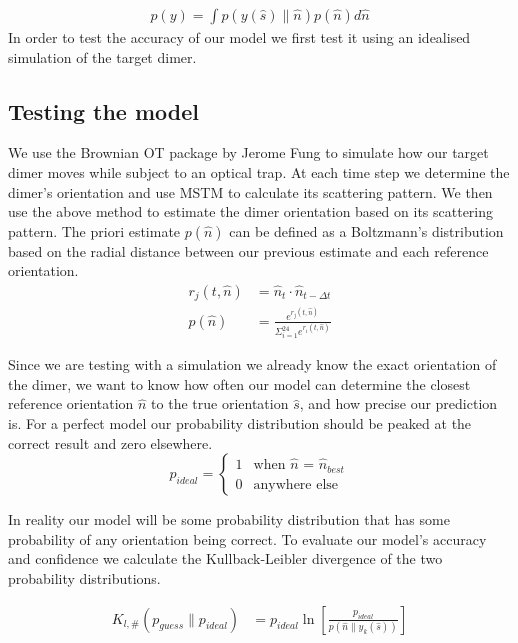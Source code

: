 \documentclass[11pt]{article}
\begin{document}
	\begin{align}
		p(y) = \int p(y(\hat{s})\parallel \hat{n}) p(\hat{n}) d\hat{n}
	\end{align}
	In order to test the accuracy of our model we first test it using an idealised simulation of the target dimer. 
	
	\subsection*{Testing the model}
	We use the Brownian OT package by Jerome Fung \cite{Brownian_OT} to simulate how our target dimer moves while subject to an optical trap. At each time step we determine the dimer's orientation and use MSTM to calculate its scattering pattern. We then use the above method to estimate the dimer orientation based on its scattering pattern. The priori estimate $p(\hat{n})$ can be defined as a Boltzmann's distribution based on the radial distance between our previous estimate and each reference orientation. 
	\begin{align}
		r_j(t, \hat{n})&= \hat{n}_{t} \cdot \hat{n}_{t-\Delta t} \\
		p(\hat{n})&= \frac{e^{r_j(t,\hat{n})}}
		{\Sigma_{i=1}^{24}e^{r_i(t, \hat{n})}}
	\end{align}
	
	Since we are testing with a simulation we already know the exact orientation of the dimer, we want to know how often our model can determine the closest reference orientation $\hat{n}$ to the true orientation $\hat{s}$, and how precise our prediction is. For a perfect model our probability distribution should be peaked at the correct result and zero elsewhere.
	\begin{equation}
		p_{ideal}=
		\begin{cases}
			1 & \text{when $\hat{n}$ = $\hat{n}_{best}$}\\
			0 & \text{anywhere else}
		\end{cases}
	\end{equation}

	In reality our model will be some probability distribution that has some probability of any orientation being correct. To evaluate our model's accuracy and confidence we calculate the Kullback-Leibler divergence of the two probability distributions. 
	
	\begin{align}
		K_{l, \#}(p_{guess} \parallel p_{ideal}) &= 
		p_{ideal} \ln \left[
		\frac{p_{ideal}}{p(\hat{n}\parallel y_k(\hat{s}))}
		\right]
	\end{align}
\end{document}
